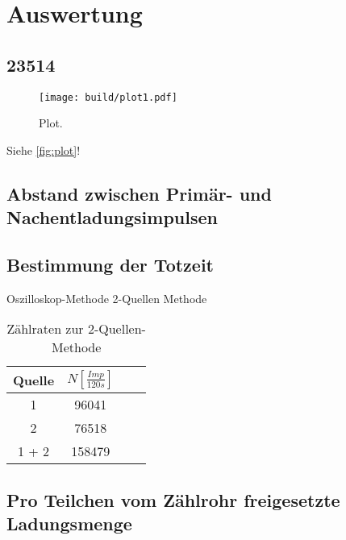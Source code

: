 \section{Auswertung}
\label{sec:Auswertung}

\subsection{23514}
\begin{figure}
  \centering
  \texttt{[image: build/plot1.pdf]}
  \caption{Plot.}
  \label{fig:plot}
\end{figure}


Siehe \autoref{fig:plot}!
\subsection{Abstand zwischen Primär- und Nachentladungsimpulsen}
\subsection{Bestimmung der Totzeit}
Oszilloskop-Methode
2-Quellen Methode
\begin{table}
  \centering
  \caption{Zählraten zur 2-Quellen-Methode}
\label{tab:mess2}
  \begin{tabular}{c c c c}
  \toprule
  Quelle & $N [\frac{Imp}{120s}]$ \\
  \midrule
  1     & 96041  \\
  2     & 76518 \\
  1 + 2 & 158479 \\
  \bottomrule
  \end{tabular}
  \end{table}
  \subsection{Pro Teilchen vom Zählrohr freigesetzte Ladungsmenge}
  